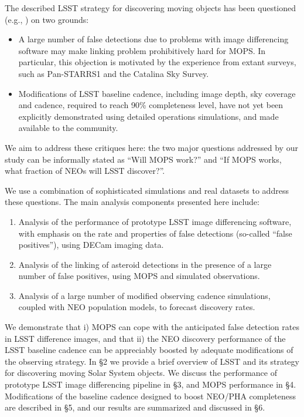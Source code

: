 The described LSST strategy for discovering moving objects has been questioned (e.g., \citealt{GMS2016}) on
two grounds:
\begin{itemize}
\item A large number of false detections due to problems with image differencing software may
make linking problem prohibitively hard for MOPS. In particular, this objection is motivated by the experience
from extant surveys, such as Pan-STARRS1 and the Catalina Sky Survey.
\item Modifications of LSST baseline cadence, including image depth, sky coverage and cadence,
required to reach 90\% completeness level, have not yet been explicitly demonstrated using detailed
operations simulations, and made available to the community.
\end{itemize}
We aim to address these critiques here: the two major questions addressed by our study can be informally
stated as ``Will MOPS work?'' and ``If MOPS works, what fraction of  NEOs will LSST discover?''.

We use a combination of sophisticated simulations and real datasets to address these questions.
The main analysis components presented here include:
\begin{enumerate}
\item Analysis of the performance of prototype LSST image differencing software, with emphasis on the rate and
    properties of false detections (so-called ``false positives''), using DECam imaging data.
\item Analysis of the linking of asteroid detections in the presence of a large number of false positives, using MOPS
         and simulated observations.
\item Analysis of a large number of modified observing cadence simulations, coupled with NEO population
          models, to forecast discovery rates.
\end{enumerate}

We demonstrate that i) MOPS can cope with the anticipated false detection rates
in LSST difference images, and that ii) the NEO discovery performance of the LSST baseline cadence
can be appreciably boosted by adequate modifications of the observing strategy.
In \S2 we provide a brief overview of LSST and its strategy for discovering moving Solar
System objects. We discuss the performance of prototype LSST image differencing pipeline
in \S3, and MOPS performance in \S4. Modifications of the baseline cadence designed to
boost NEO/PHA completeness are described in \S5, and our results are summarized and
discussed in \S6.
